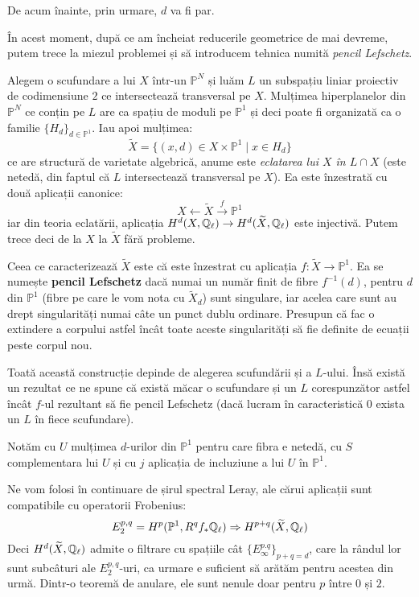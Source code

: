 \documentclass[13pt,openany,oneside]{book}
\begin{document}
De acum înainte, prin urmare, $d$ va fi par.

În acest moment, după ce am încheiat reducerile geometrice de mai devreme, putem trece la miezul problemei și să introducem tehnica numită {\it pencil Lefschetz}.

Alegem o scufundare a lui $X$ într-un $\mathbb{P}^N$ și luăm $L$ un subspațiu liniar proiectiv de codimensiune $2$ ce intersectează transversal pe $X$. Mulțimea hiperplanelor din $\mathbb{P}^N$ ce conțin pe $L$ are ca spațiu de moduli pe $\mathbb{P}^1$ și deci poate fi organizată ca o familie $\{H_d\}_{d\in\mathbb{P}^1}$. Iau apoi mulțimea:
$$\widetilde{X}=\{(x,d)\in X \times \mathbb{P}^1 \mid x \in H_d\}$$
ce are structură de varietate algebrică, anume este {\it eclatarea lui $X$ în $L\cap X$} (este netedă, din faptul că $L$ intersectează transversal pe $X$). Ea este înzestrată cu două aplicații canonice:
$$X \leftarrow \widetilde{X} \xrightarrow{f} \mathbb{P}^1$$
iar din teoria eclatării, aplicația $H^d(X,\mathbb{Q}_\ell) \rightarrow H^d(\widetilde{X},\mathbb{Q}_\ell)$ este injectivă. Putem trece deci de la $X$ la $\widetilde{X}$ fără probleme.

Ceea ce caracterizează $\widetilde{X}$ este că este înzestrat cu aplicația $f : \widetilde{X} \rightarrow \mathbb{P}^1$. Ea se numește {\bf pencil Lefschetz} dacă numai un număr finit de fibre $f^{-1}(d)$, pentru $d$ din $\mathbb{P}^1$ (fibre pe care le vom nota cu $\widetilde{X}_d$) sunt singulare, iar acelea care sunt au drept singularități numai câte un punct dublu ordinare. Presupun că fac o extindere a corpului astfel încât toate aceste singularități să fie definite de ecuații peste corpul nou.

Toată această construcție depinde de alegerea scufundării și a $L$-ului. Însă există un rezultat ce ne spune că există măcar o scufundare și un $L$ corespunzător astfel încât $f$-ul rezultant să fie pencil Lefschetz (dacă lucram în caracteristică $0$ exista un $L$ în fiece scufundare).

Notăm cu $U$ mulțimea $d$-urilor din $\mathbb{P}^1$ pentru care fibra e netedă, cu $S$ complementara lui $U$ și cu $j$ aplicația de incluziune a lui $U$ în $\mathbb{P}^1$.

Ne vom folosi în continuare de șirul spectral Leray, ale cărui aplicații sunt compatibile cu operatorii Frobenius:
$$E_2^{p,q}=H^p(\mathbb{P}^1,R^q f_* \mathbb{Q}_\ell) \Rightarrow H^{p+q}(\widetilde{X},\mathbb{Q}_\ell)$$
Deci $H^d(\widetilde{X},\mathbb{Q}_\ell)$ admite o filtrare cu spațiile cât $\{E_\infty^{p.q}\}_{p+q=d}$, care la rândul lor sunt subcâturi ale $E_2^{p,q}$-uri, ca urmare e suficient să arătăm pentru acestea din urmă. Dintr-o teoremă de anulare, ele sunt nenule doar pentru $p$ între $0$ și $2$.
\end{document}
